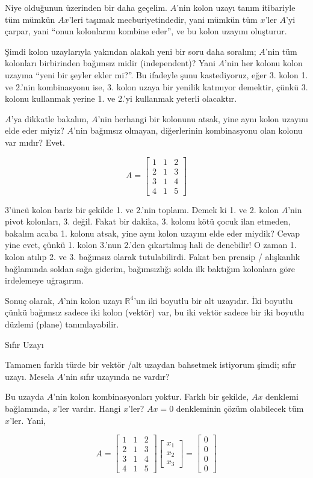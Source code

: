 \documentclass[12pt,fleqn]{article}\usepackage{../../common}
\begin{document}
Niye olduğunun üzerinden bir daha geçelim. $A$'nin kolon uzayı tanım
itibariyle tüm mümkün $Ax$'leri taşımak mecburiyetindedir, yani mümkün tüm
$x$'ler $A$'yi çarpar, yani ``onun kolonlarını kombine eder'', ve bu kolon
uzayını oluşturur. 

Şimdi kolon uzaylarıyla yakından alakalı yeni bir soru daha soralım;
$A$'nin tüm kolonları birbirinden bağımsız midir (independent)? Yani
$A$'nin her kolonu kolon uzayına ``yeni bir şeyler ekler mi?''. Bu ifadeyle
şunu kastediyoruz, eğer 3. kolon 1. ve 2.'nin kombinasyonu ise, 3. kolon
uzaya bir yenilik katmıyor demektir, çünkü 3. kolonu kullanmak yerine 1. ve
2.'yi kullanmak yeterli olacaktır. 

$A$'ya dikkatle bakalım, $A$'nin herhangi bir kolonunu atsak, yine aynı
kolon uzayını elde eder miyiz? $A$'nin bağımsız olmayan, diğerlerinin
kombinasyonu olan kolonu var mıdır? Evet. 

$$ A = 
\left[\begin{array}{rrr}
1 & 1 & 2 \\
2 & 1 & 3 \\
3 & 1 & 4 \\
4 & 1 & 5 
\end{array}\right]
 $$

3'üncü kolon bariz bir şekilde 1. ve 2.'nin toplamı. Demek ki 1. ve 2. kolon
$A$'nin pivot kolonları, 3. değil. Fakat bir dakika, 3. kolonu kötü çocuk
ilan etmeden, bakalım acaba 1. kolonu atsak, yine aynı kolon uzayını elde
eder miydik? Cevap yine evet, çünkü 1. kolon 3.'nun 2.'den çıkartılmış hali
de denebilir! O zaman 1. kolon atılıp 2. ve 3. bağımsız olarak
tutulabilirdi. Fakat ben prensip / alışkanlık bağlamında  soldan
sağa giderim, bağımsızlığı solda ilk baktığım kolonlara göre
irdelemeye uğraşırım.

Sonuç olarak, $A$'nin kolon uzayı $\mathbb{R}^4$'un iki boyutlu bir alt
uzayıdır. İki boyutlu çünkü bağımsız sadece iki kolon (vektör) var, bu iki
vektör sadece bir iki boyutlu düzlemi (plane) tanımlayabilir. 

Sıfır Uzayı

Tamamen farklı türde bir vektör /alt uzaydan bahsetmek istiyorum şimdi; sıfır
uzayı. Mesela $A$'nin sıfır uzayında ne vardır? 

Bu uzayda $A$'nin kolon kombinasyonları yoktur. Farklı bir şekilde, $Ax$
denklemi bağlamında, $x$'ler vardır. Hangi $x$'ler? $Ax=0$ denkleminin çözüm
olabilecek tüm $x$'ler. Yani,

$$ A = 
\left[\begin{array}{rrr}
1 & 1 & 2 \\
2 & 1 & 3 \\
3 & 1 & 4 \\
4 & 1 & 5 
\end{array}\right]
\left[\begin{array}{r}
x_1  \\
x_2  \\
x_3  
\end{array}\right] 
=
\left[\begin{array}{r}
0  \\
0  \\
0  \\
0  
\end{array}\right]
 $$
\end{document}
